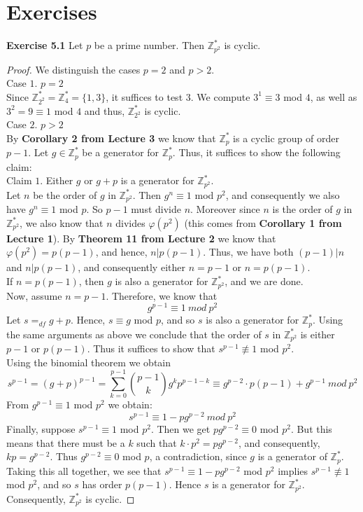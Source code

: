 \documentclass[a4paper]{article}
\begin{document}
\section{Exercises}
\noindent \textbf{Exercise 5.1}  Let $p$ be a prime number. Then $\mathbb{Z}^{*}_{p^2}$ is cyclic.
\begin{proof}
We distinguish the cases $p = 2$ and $p > 2$.\\
Case $1$. $p = 2$\\
Since $\mathbb{Z}_{2^{2}}^{*} = \mathbb{Z}_{4}^{*} = \{1, 3 \}$, it suffices to test $3$. We compute $3^{1} \equiv 3$ mod $4$, as well as $3^2 = 9 \equiv 1$ mod $4$ and thus, $\mathbb{Z}_{2^{2}}^{*}$ is cyclic.\\
Case $2$. $p > 2$\\
By \textbf{Corollary 2 from Lecture 3} we know that $\mathbb{Z}_{p}^{*}$ is a cyclic group of order $p - 1$. Let $g \in \mathbb{Z}_{p}^{*}$ be a generator for $\mathbb{Z}_{p}^{*}$. Thus, it suffices to show the following claim:\\
Claim $1$. Either $g$ or $g + p$ is a generator for $\mathbb{Z}_{p^{2}}^{*}$.\\
Let $n$ be the order of $g$ in $\mathbb{Z}_{p^{2}}^{*}$. Then $g^{n} \equiv 1$ mod $p^{2}$, and consequently we also have $g^{n} \equiv 1$ mod $p$. So $p - 1$ must divide $n$. Moreover since $n$ is the order of $g$ in $\mathbb{Z}_{p^{2}}^{*}$, we also know that $n$ divides $\varphi (p^{2})$ (this comes from \textbf{Corollary 1 from Lecture 1}). By \textbf{Theorem 11 from Lecture 2} we know that $\varphi (p^{2}) = p(p - 1)$, and hence, $n|p(p - 1)$. Thus, we have both $(p - 1)|n$ and $n|p(p - 1)$, and consequently either $n = p - 1$ or $n = p(p - 1)$.\\
If $n = p(p - 1)$, then $g$ is also a generator for $\mathbb{Z}_{p^{2}}^{*}$, and we are done.\\
Now, assume $n = p - 1$. Therefore, we know that
$$g^{p - 1} \equiv 1\ mod\ p^{2}$$
Let $s =_{df} g + p$. Hence, $s \equiv g$ mod $p$, and so $s$ is also a generator for $\mathbb{Z}_{p}^{*}$. Using the same arguments as above we conclude that the order of $s$ in $\mathbb{Z}_{p^{2}}^{*}$ is either $p - 1$ or $p(p - 1)$. Thus it suffices to show that $s^{p - 1} \not \equiv 1$ mod $p^{2}$.\\
Using the binomial theorem we obtain
$$s^{p-1} = (g + p)^{p - 1} = \sum_{k = 0}^{p - 1} \binom{p-1}{k} g^{k}p^{p - 1 - k} \equiv g^{p - 2} \cdot p(p - 1) + g^{p - 1}\ mod\ p^{2}$$
From $g^{p - 1} \equiv 1$ mod $p^{2}$ we obtain:
$$s^{p - 1} \equiv 1 - pg^{p-2}\ mod\ p^{2}$$
Finally, suppose $s^{p - 1} \equiv 1$ mod $p^{2}$. Then we get $pg^{p - 2} \equiv 0$ mod $p^{2}$. But this means that there must be a $k$ such that $k \cdot p^{2} = pg^{p - 2}$, and consequently, $kp = g^{p - 2}$. Thus $g^{p - 2} \equiv 0$ mod $p$, a contradiction, since $g$ is a generator of $\mathbb{Z}_{p}^{*}$.\\
Taking this all together, we see that $s^{p - 1} \equiv 1 - pg^{p-2}$ mod $p^{2}$ implies $s^{p - 1} \not \equiv 1$ mod $p^{2}$, and so $s$ has order $p(p - 1)$. Hence $s$ is a generator for $\mathbb{Z}_{p^{2}}^{*}$. Consequently, $\mathbb{Z}_{p^{2}}^{*}$ is cyclic.
\end{proof}
\end{document}
